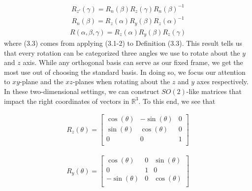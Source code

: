 \documentclass[10pt]{ucthesis}
\newcommand{\R}{\mathbb{R}}
\begin{document}
\begin{equation}
	\begin{aligned}
		R_{z'}(\gamma) = R_n(\beta)R_z(\gamma)R_n(\beta)^{-1}
	\end{aligned}
\end{equation}
\begin{equation}
	\begin{aligned}
		R_n(\beta) = R_z(\alpha)R_y(\beta)R_z(\alpha)^{-1}
	\end{aligned}
\end{equation}
\begin{equation}
	\begin{aligned}
		R(\alpha,\beta,\gamma) = R_z(\alpha)R_y(\beta)R_z(\gamma)
	\end{aligned}
\end{equation}
where (3.3) comes from applying (3.1-2) to Definition (3.3). This result tells us that every rotation can be categorized three angles we use to rotate about the $y$ and $z$ axis. While any orthogonal basis can serve as our fixed frame, we get the most use out of choosing the standard basis. In doing so, we focus our attention to $xy$-plane and the $xz$-planes when rotating about the $z$ and $y$ axes respectively. In these two-dimensional settings, we can construct $SO(2)$-like matrices that impact the right coordinates of vectors in $\R^3$. To this end, we see that

\begin{equation}
	\begin{aligned}
		R_z(\theta) = \begin{bmatrix}
						\cos(\theta) & -\sin(\theta) & 0 \\
						\sin(\theta) & \cos(\theta) & 0 \\
						0 & 0 & 1 \\
						\end{bmatrix}
	\end{aligned}
\end{equation}

\begin{equation}
	\begin{aligned}
		R_y(\theta) = \begin{bmatrix}
						\cos(\theta) & 0& \sin(\theta) \\
						0 & 1 & 0 \\
						-\sin(\theta) &0& \cos(\theta) \\
						\end{bmatrix}
	\end{aligned}
\end{equation}
\end{document}

